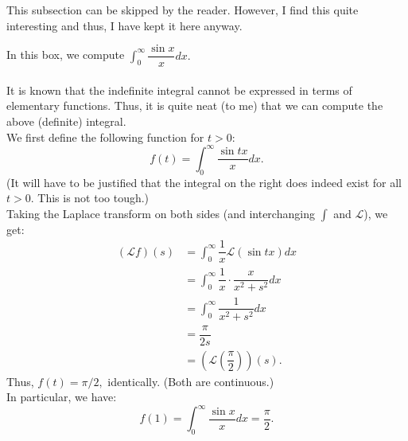 This subsection can be skipped by the reader. However, I find this quite interesting and thus, I have kept it here anyway.
\begin{mdframed}[style=boxstyle, frametitle={The sinc integral}]
	In this box, we compute $\displaystyle\int_{0}^{\infty} \dfrac{\sin x}{x} dx.$\\~\\
	It is known that the indefinite integral cannot be expressed in terms of elementary functions. Thus, it is quite neat (to me) that we can compute the above (definite) integral.\\
	We first define the following function for $t > 0:$
	\begin{equation*} 
		f(t) = \int_{0}^{\infty} \dfrac{\sin tx}{x} dx.
	\end{equation*}
	(It will have to be justified that the integral on the right does indeed exist for all $t > 0$. This is not too tough.)\\
	Taking the Laplace transform on both sides (and interchanging $\int$ and $\mathcal{L}$), we get:
	\begin{align*} 
		(\mathcal{L}f)(s) &= \int_{0}^{\infty} \dfrac{1}{x} \mathcal{L}(\sin tx) dx\\
		&= \int_{0}^{\infty} \dfrac{1}{x}\cdot\dfrac{x}{x^2 + s^2} dx\\
		&= \int_{0}^{\infty} \dfrac{1}{x^2 + s^2} dx\\
		&= \dfrac{\pi}{2s}\\
		&= \left(\mathcal{L}\left(\dfrac{\pi}{2}\right)\right)(s).
	\end{align*}
	Thus, $f(t) = \pi/2,$ identically. (Both are continuous.)\\
	In particular, we have:
	\begin{equation*} 
		f(1) = \int_{0}^{\infty} \dfrac{\sin x}{x} dx = \dfrac{\pi}{2}.
	\end{equation*}
\end{mdframed}
